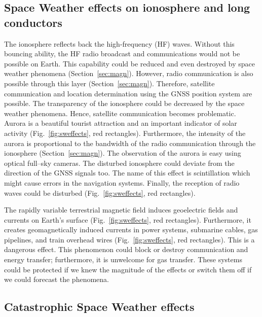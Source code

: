 \documentclass[sn-aps]{sn-jnl}%
\begin{document}
\subsection{Space Weather effects on ionosphere and long conductors}
\label{sec:swgeneral}

The ionosphere reflects back the high-frequency (HF) waves. Without this bouncing ability, the HF radio broadcast and communications would not be possible on Earth. This capability could be reduced and even destroyed by space weather phenomena (Section~\ref{sec:magn}). However, radio communication is also possible through this layer (Section~\ref{sec:magn}). Therefore, satellite communication and location determination using the GNSS position system are possible. The transparency of the ionosphere could be decreased by the space weather phenomena. Hence, satellite communication becomes problematic. Aurora is a beautiful tourist attraction and an important indicator of solar activity (Fig.~\ref{fig:sweffects}, red rectangles). Furthermore, the intensity of the aurora is proportional to the bandwidth of the radio communication through the ionosphere (Section~\ref{sec:magn}). The observation of the aurora is easy using optical full--sky cameras. The disturbed ionosphere could deviate from the direction of the GNSS signals too. The name of this effect is scintillation which might cause errors in the navigation systems. Finally, the reception of radio waves could be disturbed (Fig.~\ref{fig:sweffects}, red rectangles).

The rapidly variable terrestrial magnetic field induces geoelectric fields and currents on Earth's surface (Fig.~\ref{fig:sweffects}, red rectangles). Furthermore, it creates geomagnetically induced currents in power systems, submarine cables, gas pipelines, and train overhead wires (Fig.~\ref{fig:sweffects}, red rectangles). This is a dangerous effect. This phenomenon could block or destroy communication and energy transfer; furthermore, it is unwelcome for gas transfer. These systems could be protected if we knew the magnitude of the effects or switch them off if we could forecast the phenomena. 

\subsection{Catastrophic Space Weather effects}
\label{sec:swcata}
\end{document}
